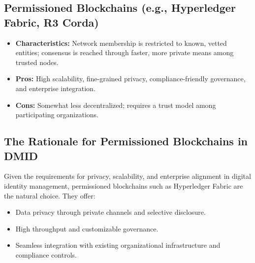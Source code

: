 \subsection*{Permissioned Blockchains (e.g., Hyperledger Fabric, R3 Corda)}
\begin{itemize}
    \item \textbf{Characteristics:} Network membership is restricted to known, vetted entities; consensus is reached through faster, more private means among trusted nodes.
    \item \textbf{Pros:} High scalability, fine-grained privacy, compliance-friendly governance, and enterprise integration.
    \item \textbf{Cons:} Somewhat less decentralized; requires a trust model among participating organizations.
\end{itemize}

\subsection*{The Rationale for Permissioned Blockchains in DMID}
Given the requirements for privacy, scalability, and enterprise alignment in digital identity management, permissioned blockchains such as Hyperledger Fabric are the natural choice. They offer:
\begin{itemize}
    \item Data privacy through private channels and selective disclosure.
    \item High throughput and customizable governance.
    \item Seamless integration with existing organizational infrastructure and compliance controls.
\end{itemize}



